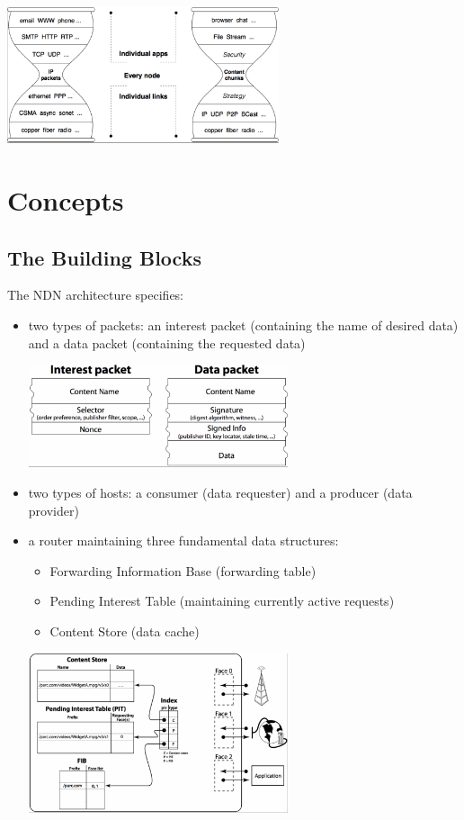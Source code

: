 		\begin{center}\includegraphics[width=0.6\textwidth]{media/ndn_hourglass2.png}\end{center}

	\section{Concepts}
		\subsection{The Building Blocks}
			The NDN architecture specifies:
				\begin{itemize}
				\item two types of packets: an interest packet (containing the name of desired data) and a data packet (containing the requested data)
				\begin{center}\includegraphics[width=0.6\textwidth]{media/ndn_packets1.png}\end{center}
				\item two types of hosts: a consumer (data requester) and a producer (data provider)
				\item a router maintaining three fundamental data structures:
					\begin{itemize}
					\item Forwarding Information Base (forwarding table)
					\item Pending Interest Table (maintaining currently active requests)
					\item Content Store (data cache)
					\end{itemize}
					\begin{center}\includegraphics[width=0.6\textwidth]{media/ndn_router1.png}\end{center}

				\end{itemize}


